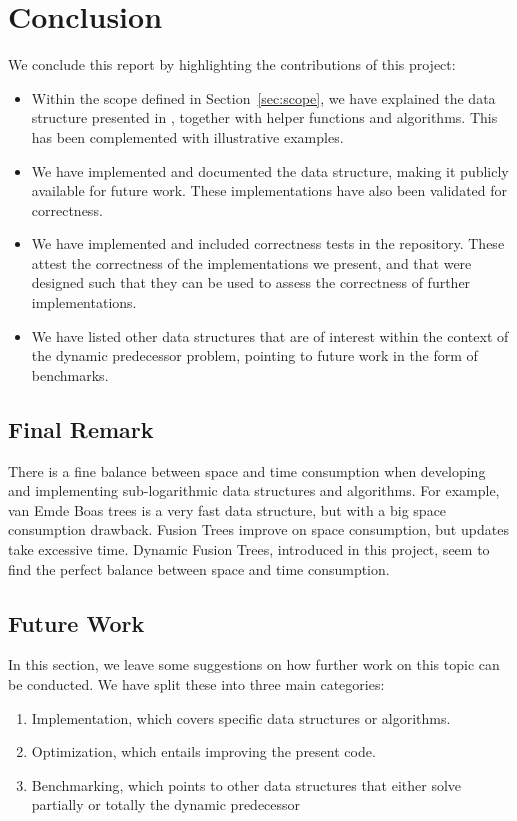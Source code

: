 \chapter{Conclusion} \label{sec:conclusionChapter}

We conclude this report by highlighting the contributions of this project:
\begin{itemize}
    \item
    Within the scope defined in Section~\ref{sec:scope}, we have explained the data structure presented in \cite{patrascu2014dynamic}, together with helper functions and algorithms. This has been complemented with illustrative examples.
    
    \item
    We have implemented and documented the data structure, making it publicly available for future work. These implementations have also been validated for correctness.
    
    \item
    We have implemented and included correctness tests in the repository. These attest the correctness of the implementations we present, and that were designed such that they can be used to assess the correctness of further implementations.
    
    \item
    We have listed other data structures that are of interest within the context of the dynamic predecessor problem, pointing to future work in the form of benchmarks.
\end{itemize}

\section{Final Remark}

There is a fine balance between space and time consumption when developing and implementing sub-logarithmic data structures and algorithms. For example, van Emde Boas trees is a very fast data structure, but with a big space consumption drawback. Fusion Trees improve on space consumption, but updates take excessive time. Dynamic Fusion Trees, introduced in this project, seem to find the perfect balance between space and time consumption.

\section{Future Work} \label{sec:futureWork}
In this section, we leave some suggestions on how further work on this topic can be conducted. We have split these into three main categories:
\begin{enumerate}
    \item
    Implementation, which covers specific data structures or algorithms.
    
    \item
    Optimization, which entails improving the present code.
    
    \item
    Benchmarking, which points to other data structures that either solve partially or totally the dynamic predecessor 
    
\end{enumerate}

